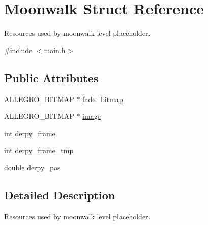 \hypertarget{structMoonwalk}{\section{Moonwalk Struct Reference}
\label{structMoonwalk}
}


Resources used by moonwalk level placeholder.  




{\ttfamily \#include $<$main.\-h$>$}

\subsection*{Public Attributes}
\begin{DoxyCompactItemize}
\item 
A\-L\-L\-E\-G\-R\-O\-\_\-\-B\-I\-T\-M\-A\-P $\ast$ \hyperlink{structMoonwalk_adfea9d8976238abf5d94a797df7ee929}{fade\-\_\-bitmap}
\item 
A\-L\-L\-E\-G\-R\-O\-\_\-\-B\-I\-T\-M\-A\-P $\ast$ \hyperlink{structMoonwalk_a99f8ce8d3a4a8c3faca18b7c36eccdca}{image}
\item 
int \hyperlink{structMoonwalk_a4a3874c58e11745d4896b004861e1555}{derpy\-\_\-frame}
\item 
int \hyperlink{structMoonwalk_ab087ba01cd2a107286ec8f75f58c676c}{derpy\-\_\-frame\-\_\-tmp}
\item 
double \hyperlink{structMoonwalk_a69689c77a64928bfb52c1dc1e1f7b33f}{derpy\-\_\-pos}
\end{DoxyCompactItemize}


\subsection{Detailed Description}
Resources used by moonwalk level placeholder. 

